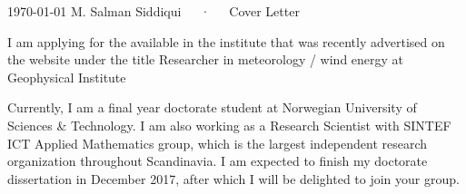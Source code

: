 \documentclass[11pt, a4paper]{awesome-cv}
\begin{document}
	
	\makecvheader
	
	\makecvfooter
	{\today}
	{M. Salman Siddiqui~~~·~~~Cover Letter}
	{}
	
	\makelettertitle
	
	\begin{cvletter}
		
		
		I am applying for the available in the institute that was recently advertised on the website under the title Researcher in meteorology / wind energy at Geophysical Institute
		
		Currently, I am a final year doctorate student at Norwegian University of Sciences \& Technology. I am also working as a Research Scientist with SINTEF ICT Applied Mathematics group, which is the largest independent research organization throughout Scandinavia.  I am expected to finish my doctorate dissertation in December 2017, after which I will be delighted to join your group.
	

\end{cvletter}
\end{document}
